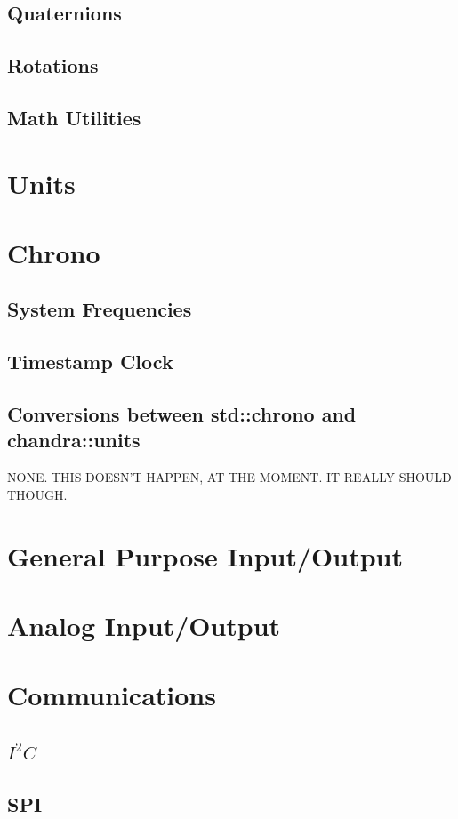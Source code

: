 \documentclass[10pt,letterpaper]{memoir} %
\newcommand{\iic}[0]{$I^{2}C$}
\begin{document}
\section{Quaternions}
\section{Rotations}
\section{Math Utilities}

\chapter{Units}

\chapter{Chrono}
\section{System Frequencies}
\section{Timestamp Clock}
\section{Conversions between std::chrono and chandra::units}
NONE.  THIS DOESN'T HAPPEN, AT THE MOMENT.  IT REALLY SHOULD THOUGH.

\chapter{General Purpose Input/Output}

\chapter{Analog Input/Output}

\chapter{Communications}
\section{\iic}
\section{SPI}
\end{document}
